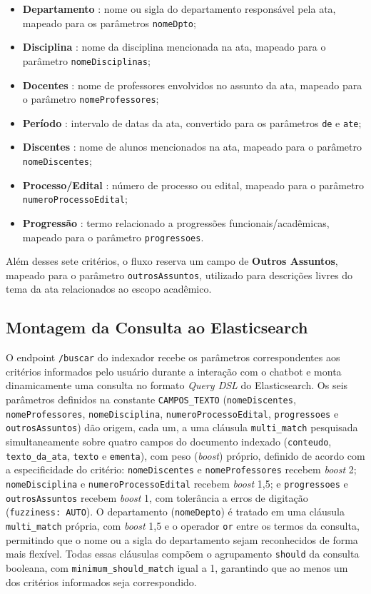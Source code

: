 \begin{itemize}
  \item \textbf{Departamento} : nome ou sigla do departamento responsável pela ata, mapeado para os parâmetros \texttt{nomeDpto};
  \item \textbf{Disciplina} : nome da disciplina mencionada na ata, mapeado para o parâmetro \texttt{nomeDisciplinas};
  \item \textbf{Docentes} : nome de professores envolvidos no assunto da ata, mapeado para o parâmetro \texttt{nomeProfessores};
  \item \textbf{Período} : intervalo de datas da ata, convertido para os parâmetros \texttt{de} e \texttt{ate};
  \item \textbf{Discentes} : nome de alunos mencionados na ata, mapeado para o parâmetro \texttt{nomeDiscentes};
  \item \textbf{Processo/Edital} : número de processo ou edital, mapeado para o parâmetro \texttt{numeroProcessoEdital};
  \item \textbf{Progressão} : termo relacionado a progressões funcionais/acadêmicas, mapeado para o parâmetro \texttt{progressoes}.
\end{itemize}

Além desses sete critérios, o fluxo reserva um campo de \textbf{Outros Assuntos}, mapeado para o parâmetro \texttt{outrosAssuntos}, utilizado para descrições livres do tema da ata relacionados ao escopo acadêmico.

\subsection{Montagem da Consulta ao Elasticsearch}

O endpoint \texttt{/buscar} do indexador recebe os parâmetros correspondentes aos critérios informados pelo usuário durante a interação com o chatbot e monta dinamicamente uma consulta no formato \textit{Query DSL} do Elasticsearch. Os seis parâmetros definidos na constante \texttt{CAMPOS\_TEXTO} (\texttt{nomeDiscentes}, \texttt{nomeProfessores}, \texttt{nomeDisciplina}, \texttt{numeroProcessoEdital}, \texttt{progressoes} e \texttt{outrosAssuntos}) dão origem, cada um, a uma cláusula \texttt{multi\_match} pesquisada simultaneamente sobre quatro campos do documento indexado (\texttt{conteudo}, \texttt{texto\_da\_ata}, \texttt{texto} e \texttt{ementa}), com peso (\textit{boost}) próprio, definido de acordo com a especificidade do critério: \texttt{nomeDiscentes} e \texttt{nomeProfessores} recebem \textit{boost} 2; \texttt{nomeDisciplina} e \texttt{numeroProcessoEdital} recebem \textit{boost} 1,5; e \texttt{progressoes} e \texttt{outrosAssuntos} recebem \textit{boost} 1, com tolerância a erros de digitação (\texttt{fuzziness: AUTO}). O departamento (\texttt{nomeDepto}) é tratado em uma cláusula \texttt{multi\_match} própria, com \textit{boost} 1,5 e o operador \texttt{or} entre os termos da consulta, permitindo que o nome ou a sigla do departamento sejam reconhecidos de forma mais flexível. Todas essas cláusulas compõem o agrupamento \texttt{should} da consulta booleana, com \texttt{minimum\_should\_match} igual a 1, garantindo que ao menos um dos critérios informados seja correspondido.


